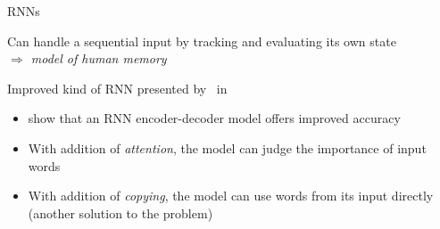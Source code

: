 \begin{frame}{\aclp{RNN}}
    \begin{description}
        \setlength{\itemsep}{1.05ex}

        \item[\acfp{RNN}:]

        Can handle a sequential input by tracking and evaluating its own state \\
        \emph{$\Longrightarrow$ model of human memory}

        \item[\acfa{LSTM}:]

        Improved kind of \acs{RNN} presented by~\citeauthor{Hochreiter97LSTM}
        in~\citeyear{Hochreiter97LSTM}~\cite{Hochreiter97LSTM}

    \end{description}

    \vspace*{0.4\baselineskip}

    \pause %

    \begin{itemize}
        \setlength{\itemsep}{1ex}
        \item

        \citeauthor*{Gao2019IdentGen} show that an \acs{RNN} encoder-decoder model offers
        improved accuracy~\cite{Gao2019IdentGen}

        \item

        With addition of \emph{attention}, the model can judge the importance of input
        words

        \item

        With addition of \emph{copying}, the model can use words from its input directly
        (another solution to the  problem)

    \end{itemize}

\end{frame}

